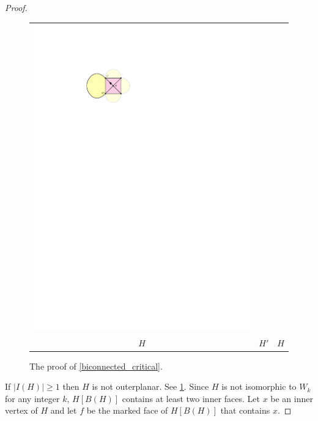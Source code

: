 \documentclass{article}
\theoremstyle{definition}
\begin{document}
\begin{proof}
\begin{figure}
\begin{tabular}{ccc}
      \includegraphics[page=3]{figs/biconnected} \\
      $H$ & $H'$ & $H$
    \end{tabular}
    \caption{The proof of \cref{biconnected_critical}.}
    \label{contraction_proof}
  \end{figure}
  If $|I(H)|\ge 1$ then $H$ is not outerplanar.  See \cref{contraction_proof}.  Since $H$ is not isomorphic to $W_k$ for any integer $k$, $H[B(H)]$ contains at least two inner faces.  Let $x$ be an inner vertex of $H$ and let $f$ be the marked face of $H[B(H)]$ that contains $x$.

\end{proof}
\end{document}
